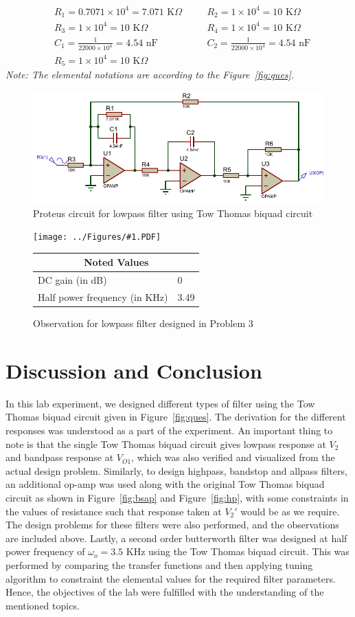 \documentclass{lab_sheet}
\newcommand{\proteusObservationA}[4]{ 
\begin{figure}[H]
   \begin{minipage}[b]{0.60\linewidth}
     \centering
     \texttt{[image: ../Figures/\#1.PDF]}
   \end{minipage}%
   \begin{minipage}[b]{0.40\linewidth}
     \centering
 \begin{tabular}[b]{|M{4cm}|M{1cm}|}
   \hline
   \multicolumn{2}{|c|}{Noted Values} \\
   \hline \hline
   DC gain (in dB) & #2\\ \hline
   Half power frequency (in KHz) & #3\\ \hline
 \end{tabular}
 \end{minipage}
 \caption{Observation for #4}
 \label{fig:prot_obs_a_#1}
 \end{figure}
}
\begin{document}
 \begin{equation*}
    \begin{aligned}
       &R_1=0.7071\times10^4=7.071 \text{ K}\Omega \quad &&R_2=1\times10^4=10 \text{ K}\Omega\\
       &R_3=1\times10^4=10 \text{ K}\Omega \quad &&R_4=1\times10^4=10 \text{ K}\Omega\\
       &C_1= \frac{1}{22000\times10^4}=4.54\text{ nF} \quad && 
       C_2= \frac{1}{22000\times10^4}=4.54\text{ nF}\\
       &R_5=1\times10^4=10 \text{ K}\Omega
    \end{aligned}
\end{equation*}
\textit{Note: The elemental notations are according to the Figure~\ref{fig:ques}.}
\begin{figure}[H]
    \centering
    \includegraphics[width=\linewidth]{../Figures/f_ckt}
    \caption{Proteus circuit for lowpass filter using Tow Thomas biquad circuit}
    \label{fig:protF}
\end{figure}
\proteusObservationA{protF}{0}{3.49}{lowpass filter designed in Problem 3}
\section{Discussion and Conclusion}
In this lab experiment, we designed different types of filter using the Tow Thomas biquad circuit given in Figure~\ref{fig:ques}. The derivation for the different responses was understood as a part of the experiment. An important thing to note is that the single Tow Thomas biquad circuit gives lowpass response at $V_2$ and bandpass response at $V_{O1}$, which was also verified and visualized from the actual design problem. Similarly, to design highpass, bandstop and allpass filters, an additional op-amp was used along with the original Tow Thomas biquad circuit as shown in Figure~\ref{fig:bsap} and Figure~\ref{fig:hp}, with some constraints in the values of resistance such that response taken at $V_2'$ would be as we require. The design problems for these filters were also performed, and the observations are included above. Lastly, a second order butterworth filter was designed at half power frequency of $\omega_o=3.5$ KHz using the Tow Thomas biquad circuit. This was performed by comparing the transfer functions and then applying tuning algorithm to constraint the elemental values for the required filter parameters. \\
Hence, the objectives of the lab were fulfilled with the understanding of the mentioned topics.
\end{document}
